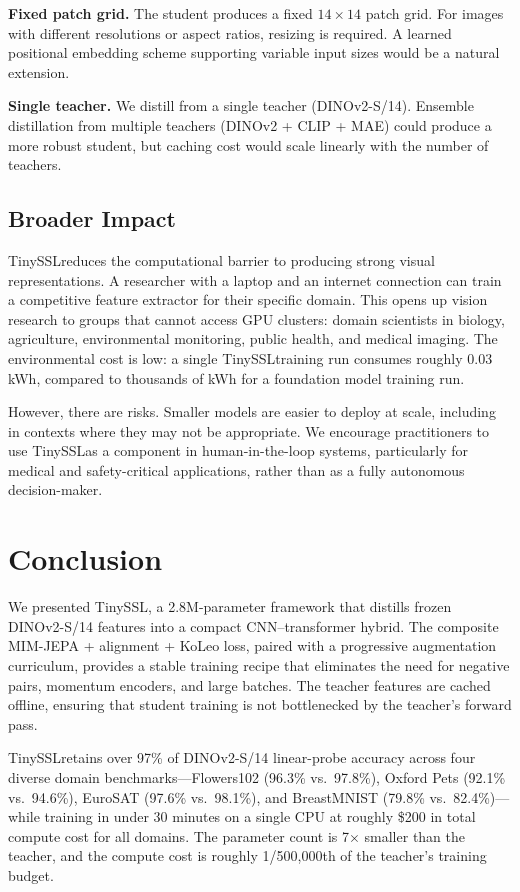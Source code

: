 \documentclass{article}
\newcommand{\method}{TinySSL}
\begin{document}
\textbf{Fixed patch grid.} The student produces a fixed $14\times14$ patch grid. For images with different resolutions or aspect ratios, resizing is required. A learned positional embedding scheme supporting variable input sizes would be a natural extension.

\textbf{Single teacher.} We distill from a single teacher (DINOv2-S/14). Ensemble distillation from multiple teachers (DINOv2 + CLIP + MAE) could produce a more robust student, but caching cost would scale linearly with the number of teachers.

\subsection{Broader Impact}

\method reduces the computational barrier to producing strong visual representations. A researcher with a laptop and an internet connection can train a competitive feature extractor for their specific domain. This opens up vision research to groups that cannot access GPU clusters: domain scientists in biology, agriculture, environmental monitoring, public health, and medical imaging. The environmental cost is low: a single \method training run consumes roughly 0.03 kWh, compared to thousands of kWh for a foundation model training run.

However, there are risks. Smaller models are easier to deploy at scale, including in contexts where they may not be appropriate. We encourage practitioners to use \method as a component in human-in-the-loop systems, particularly for medical and safety-critical applications, rather than as a fully autonomous decision-maker.

\section{Conclusion}
\label{sec:conclusion}

We presented \method, a 2.8M-parameter framework that distills frozen DINOv2-S/14 features into a compact CNN--transformer hybrid. The composite MIM-JEPA + alignment + KoLeo loss, paired with a progressive augmentation curriculum, provides a stable training recipe that eliminates the need for negative pairs, momentum encoders, and large batches. The teacher features are cached offline, ensuring that student training is not bottlenecked by the teacher's forward pass.

\method retains over 97\% of DINOv2-S/14 linear-probe accuracy across four diverse domain benchmarks---Flowers102 (96.3\% vs.\ 97.8\%), Oxford Pets (92.1\% vs.\ 94.6\%), EuroSAT (97.6\% vs.\ 98.1\%), and BreastMNIST (79.8\% vs.\ 82.4\%)---while training in under 30 minutes on a single CPU at roughly \$200 in total compute cost for all domains. The parameter count is 7$\times$ smaller than the teacher, and the compute cost is roughly 1/500,000th of the teacher's training budget.
\end{document}
